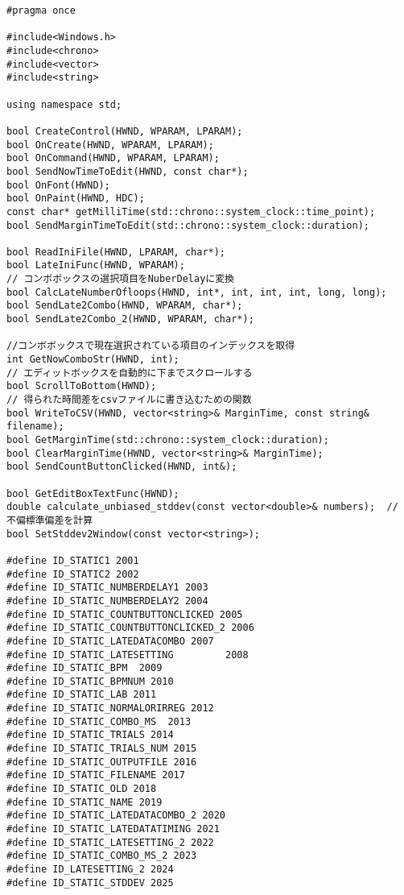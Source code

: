 \begin{lstlisting}[caption=main.h]

\end{lstlisting}

\begin{lstlisting}[caption=window.h]
#pragma once

#include<Windows.h>
#include<chrono>
#include<vector>
#include<string>

using namespace std;

bool CreateControl(HWND, WPARAM, LPARAM);
bool OnCreate(HWND, WPARAM, LPARAM);
bool OnCommand(HWND, WPARAM, LPARAM);
bool SendNowTimeToEdit(HWND, const char*);
bool OnFont(HWND);
bool OnPaint(HWND, HDC);
const char* getMilliTime(std::chrono::system_clock::time_point);
bool SendMarginTimeToEdit(std::chrono::system_clock::duration);

bool ReadIniFile(HWND, LPARAM, char*);
bool LateIniFunc(HWND, WPARAM);
// コンボボックスの選択項目をNuberDelayに変換
bool CalcLateNumberOfloops(HWND, int*, int, int, int, long, long);
bool SendLate2Combo(HWND, WPARAM, char*);
bool SendLate2Combo_2(HWND, WPARAM, char*);

//コンボボックスで現在選択されている項目のインデックスを取得
int GetNowComboStr(HWND, int);
// エディットボックスを自動的に下までスクロールする
bool ScrollToBottom(HWND);
// 得られた時間差をcsvファイルに書き込むための関数
bool WriteToCSV(HWND, vector<string>& MarginTime, const string& filename);
bool GetMarginTime(std::chrono::system_clock::duration);
bool ClearMarginTime(HWND, vector<string>& MarginTime);
bool SendCountButtonClicked(HWND, int&);

bool GetEditBoxTextFunc(HWND);
double calculate_unbiased_stddev(const vector<double>& numbers);  // 不偏標準偏差を計算
bool SetStddev2Window(const vector<string>);

#define ID_STATIC1 2001
#define ID_STATIC2 2002
#define ID_STATIC_NUMBERDELAY1 2003
#define ID_STATIC_NUMBERDELAY2 2004
#define ID_STATIC_COUNTBUTTONCLICKED 2005
#define ID_STATIC_COUNTBUTTONCLICKED_2 2006
#define ID_STATIC_LATEDATACOMBO 2007
#define ID_STATIC_LATESETTING         2008
#define ID_STATIC_BPM  2009
#define ID_STATIC_BPMNUM 2010
#define ID_STATIC_LAB 2011
#define ID_STATIC_NORMALORIRREG 2012
#define ID_STATIC_COMBO_MS  2013
#define ID_STATIC_TRIALS 2014
#define ID_STATIC_TRIALS_NUM 2015
#define ID_STATIC_OUTPUTFILE 2016
#define ID_STATIC_FILENAME 2017
#define ID_STATIC_OLD 2018
#define ID_STATIC_NAME 2019
#define ID_STATIC_LATEDATACOMBO_2 2020
#define ID_STATIC_LATEDATATIMING 2021
#define ID_STATIC_LATESETTING_2 2022
#define ID_STATIC_COMBO_MS_2 2023
#define ID_LATESETTING_2 2024
#define ID_STATIC_STDDEV 2025



\end{lstlisting}
